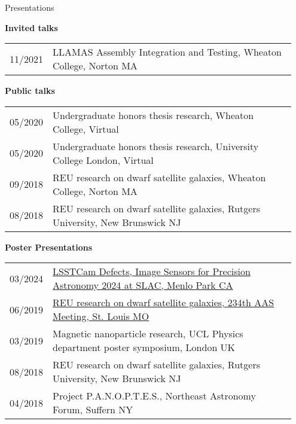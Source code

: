 \documentclass{resume} %
\begin{document}
\begin{rSection}{Presentations}

\textbf{Invited talks}  
\begin{table}[h]
\begin{tabular}{p{0.07\linewidth} p{0.88\linewidth}}
11/2021 & LLAMAS Assembly Integration and Testing, Wheaton College, Norton MA\\
\end{tabular}
\end{table}

\textbf{Public talks}
    \begin{table}[h]
\begin{tabular}{p{0.07\linewidth} p{0.88\linewidth}}
05/2020 & Undergraduate honors thesis research, Wheaton College, Virtual\\ 
05/2020 & Undergraduate honors thesis research, University College London, Virtual\\
09/2018 & REU research on dwarf satellite galaxies, Wheaton College, Norton MA\\
08/2018 & REU research on dwarf satellite galaxies, Rutgers University, New Brunswick NJ\\
\end{tabular}
\end{table}

\textbf{Poster Presentations}
\begin{table}[h]
\begin{tabular}{p{0.07\linewidth} p{0.88\linewidth}}
03/2024 & \href{https://indico.slac.stanford.edu/event/8442/contributions/8626/}{LSSTCam Defects, Image Sensors for Precision Astronomy 2024 at SLAC, Menlo Park CA}\\
06/2019 & \href{https://assets.pubpub.org/d14kkapv/41575915658488.pdf}{REU research on dwarf satellite galaxies, 234th AAS Meeting, St. Louis MO}\\
03/2019 & Magnetic nanoparticle research, UCL Physics department poster symposium, London UK\\
08/2018 & REU research on dwarf satellite galaxies, Rutgers University, New Brunswick NJ\\
04/2018 & Project P.A.N.O.P.T.E.S., Northeast Astronomy Forum, Suffern NY\\
\end{tabular}
\end{table}

\end{rSection}
\end{document}
